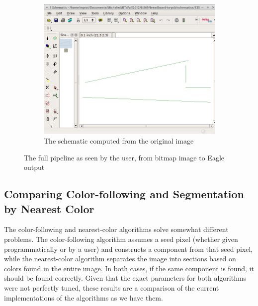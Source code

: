 \documentclass[10pt,twocolumn,letterpaper]{article}
\begin{document}
\begin{figure}[ht]
\begin{subfigure}[b]{\linewidth}
	\centering
   \includegraphics[width=0.9\linewidth]{demos/full_pipeline2_schematic.png}
	\caption{The schematic computed from the original image}
	\label{fig:schemfull}
\end{subfigure}
\caption{The full pipeline as seen by the user, from bitmap image to
  Eagle output}
\end{figure}

\subsection{Comparing Color-following and Segmentation by Nearest Color}

The color-following and nearest-color algorithms solve somewhat different
problems. The color-following algorithm assumes a seed pixel (whether given
programmatically or by a user) and constructs a component from that seed pixel,
while the nearest-color algorithm separates the image into sections based on
colors found in the entire image. In both cases, if the same component is
found, it should be found correctly. Given that the exact parameters for both
algorithms were not perfectly tuned, these results are a comparison of the
current implementations of the algorithms as we have them.
\end{document}
